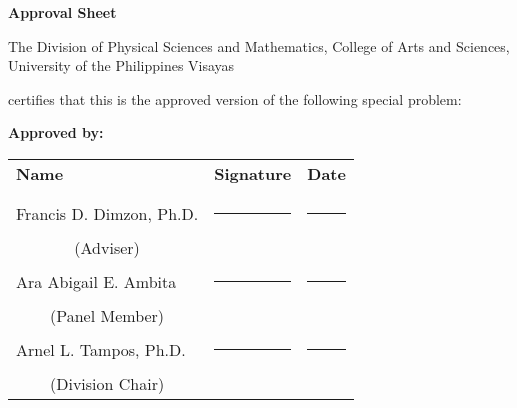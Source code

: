 \begin{center}
    \textbf{Approval Sheet}
    
    The Division of Physical Sciences and Mathematics, College of Arts and Sciences, University of the Philippines Visayas 
    
    certifies that this is the approved version of the following special problem:
    
    \end{center}
    
    {\small\textbf{Approved by:}}
    
    \newcommand{\signaturerule}{\rule{10em}{.4pt}}
        \begin{tabular}{lll}
            \bfseries Name  & \bfseries Signature & \bfseries Date\\ \\
            Francis D. Dimzon, Ph.D. &\signaturerule  & \signaturerule\\ 
            \multicolumn{1}{c}{(Adviser)} \\ 
            Ara Abigail E. Ambita &\signaturerule &\signaturerule\\
            \multicolumn{1}{c}{(Panel Member)}  \\
            Arnel L. Tampos, Ph.D. &\signaturerule &\signaturerule\\
            \multicolumn{1}{c}{(Division Chair)}
    
        \end{tabular}
    